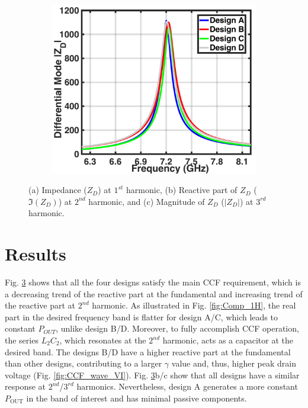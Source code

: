 \documentclass[conference]{IEEEtran}
\begin{document}
\begin{figure}[!t]
\begin{subfigure}{0.24\textwidth}
		\caption{}
		\label{fig:Comp_2H_imag}
	\end{subfigure}
	\begin{subfigure}{0.24\textwidth}
		\includegraphics[width=1\textwidth]{Images/Output_Network_Comp/Comp_3H_Mag.pdf}
		\caption{}
		\label{fig:Comp_3H_Mag}
	\end{subfigure}
	\caption{(a) Impedance ($Z_D$) at $1^{st}$ harmonic, (b) Reactive part of $Z_D$ ($\Im(Z_D)$) at $2^{nd}$ harmonic, and (c) Magnitude of $Z_D$ ($|Z_D|$) at $3^{rd}$ harmonic.}
	\label{fig:Comp_1H_2H_3H}
	\vspace{-0.1in}
\end{figure}

\section{Results}
\label{section:Results}

Fig. \ref{fig:Comp_1H_2H_3H} shows that all the four designs satisfy the main CCF requirement, which is a decreasing trend of the reactive part at the fundamental and increasing trend of the reactive part at $2^{nd}$ harmonic. As illustrated in Fig. \ref{fig:Comp_1H}, the real part in the desired frequency band is flatter for design A/C, which leads to constant $P_{OUT}$, unlike design B/D. Moreover, to fully accomplish CCF operation, the series $L_2C_2$, which resonates at the $2^{nd}$ harmonic, acts as a capacitor at the desired band. The designs B/D have a higher reactive part at the fundamental than other designs, contributing to a larger $\gamma$ value and, thus, higher peak drain voltage (Fig. \ref{fig:CCF_wave_VI}). Fig. \ref{fig:Comp_1H_2H_3H}b/c show that all designs have a similar response at $2^{nd}$/$3^{rd}$ harmonics. Nevertheless, design A generates a more constant $P_{\text{OUT}}$ in the band of interest and has minimal passive components. 
\end{document}
